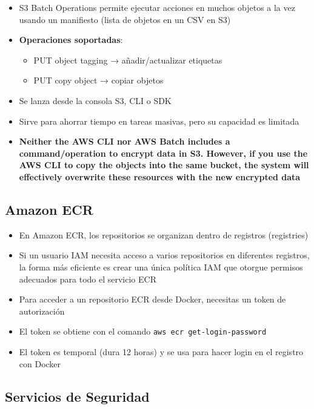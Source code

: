 \documentclass[12pt,a4paper]{report}
\newcommand{\important}[1]{\textcolor{dangerred}{\textbf{#1}}}
\begin{document}
\begin{itemize}
    \item S3 Batch Operations permite ejecutar acciones en muchos objetos a la vez usando un manifiesto (lista de objetos en un CSV en S3)
    \item \textbf{Operaciones soportadas}:
    \begin{itemize}
        \item PUT object tagging → añadir/actualizar etiquetas
        \item PUT copy object → copiar objetos
    \end{itemize}
    \item Se lanza desde la consola S3, CLI o SDK
    \item Sirve para ahorrar tiempo en tareas masivas, pero su capacidad es limitada
    \item \important{Neither the AWS CLI nor AWS Batch includes a command/operation to encrypt data in S3. However, if you use the AWS CLI to copy the objects into the same bucket, the system will effectively overwrite these resources with the new encrypted data}
\end{itemize}

\subsection{Amazon ECR}

\begin{itemize}
    \item En Amazon ECR, los repositorios se organizan dentro de registros (registries)
    \item Si un usuario IAM necesita acceso a varios repositorios en diferentes registros, la forma más eficiente es crear una única política IAM que otorgue permisos adecuados para todo el servicio ECR
    \item Para acceder a un repositorio ECR desde Docker, necesitas un token de autorización
    \item El token se obtiene con el comando \texttt{aws ecr get-login-password}
    \item El token es temporal (dura 12 horas) y se usa para hacer login en el registro con Docker
\end{itemize}

\subsection{Servicios de Seguridad}
\end{document}
